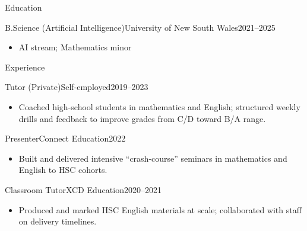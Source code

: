 \documentclass[]{mcdowellcv}
\begin{document}
\vspace{-0.2cm}
\begin{cvsection}{Education}
  \begin{cvsubsection}{B.Science (Artificial Intelligence)}{University of New South Wales}{2021–2025}
    \begin{multicols}{3}
      \begin{itemize}
        \item \small AI stream; Mathematics minor
      \end{itemize}
    \end{multicols}
    \vspace{-0.5em}
  \end{cvsubsection}
\end{cvsection}

\vspace{-0.4cm}
\begin{cvsection}{Experience}
  \begin{cvsubsection}{Tutor (Private)}{Self-employed}{2019–2023}
    \begin{itemize}
      \item Coached high-school students in mathematics and English; structured weekly drills and feedback to improve grades from C/D toward B/A range.
    \end{itemize}
  \end{cvsubsection}

  \begin{cvsubsection}{Presenter}{Connect Education}{2022}
    \begin{itemize}
      \item Built and delivered intensive “crash-course” seminars in mathematics and English to HSC cohorts.
    \end{itemize}
  \end{cvsubsection}

  \begin{cvsubsection}{Classroom Tutor}{XCD Education}{2020–2021}
    \begin{itemize}
      \item Produced and marked HSC English materials at scale; collaborated with staff on delivery timelines.
    \end{itemize}
  \end{cvsubsection}
\end{cvsection}
\end{document}
